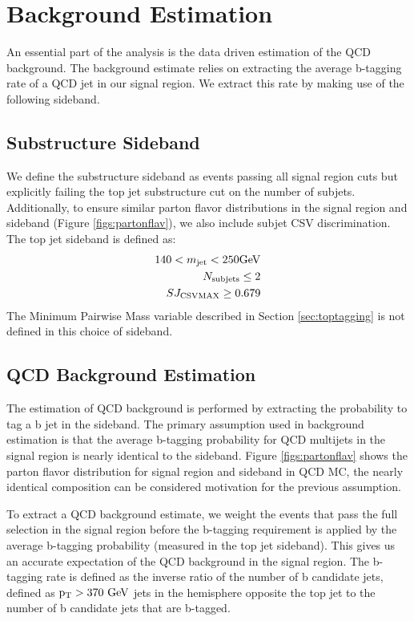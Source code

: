 \clearpage
\newpage
\chapter{Background Estimation}
\label{sec:backgroundEstimation}
An essential part of the analysis is the data driven estimation of the QCD background.  
The background estimate relies on extracting the average b-tagging rate of a QCD jet in our signal region.  
We extract this rate by making use of the following sideband.
\section{Substructure Sideband}
\label{sec:sideband}
We define the substructure sideband as events passing all signal region cuts but explicitly 
failing the top jet substructure cut on the number of subjets.  Additionally, to ensure similar parton flavor distributions in the signal region and sideband (Figure \ref{figs:partonflav}), 
we also include subjet CSV discrimination. The top jet sideband is defined as:
\begin{eqnarray}
	140  <  m_{\text{jet}}  <  250 \mathrm{GeV} \\
	N_{\text{subjets}}  \leq  2 \\
	SJ_{\text{CSVMAX}} \geq 0.679 
\end{eqnarray}
The Minimum Pairwise Mass variable described in Section \ref{sec:toptagging} is not defined in this choice of sideband.

\section{QCD Background Estimation}
\label{sec:qcdBackgroundEstimationProcedure}
\label{sec:tagrateparameterization}
The estimation of QCD background is performed by extracting the probability to tag a b jet in the sideband. 
The primary assumption used in background estimation is that the average b-tagging probability 
for QCD multijets in the signal region is nearly identical to the sideband. Figure \ref{figs:partonflav}  shows the parton flavor distribution for signal region and sideband in QCD MC, the
 nearly identical composition can be considered motivation for the previous assumption.

To extract a QCD background estimate, we weight the events that pass the full selection in the signal region before the b-tagging requirement is applied by 
the average b-tagging probability (measured in the top jet sideband).  This gives us an accurate expectation of the QCD background in the signal region.
The b-tagging rate is defined as the inverse ratio of the number of b candidate jets, 
defined as $\mathrm{p_{T}} > 370~\mathrm{GeV}$ jets in the hemisphere opposite the top jet to the number of b candidate jets that are b-tagged.  

